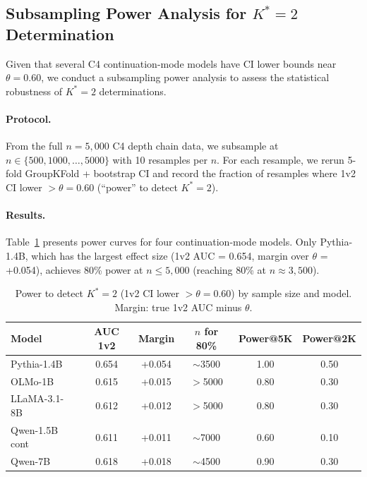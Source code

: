 \documentclass[11pt,a4paper]{article}
\begin{document}
\subsection{Subsampling Power Analysis for $K^*=2$ Determination}
\label{sec:power_analysis}

Given that several C4 continuation-mode models have CI lower bounds near $\theta = 0.60$, we conduct a subsampling power analysis to assess the statistical robustness of $K^*=2$ determinations.

\paragraph{Protocol.}
From the full $n=5{,}000$ C4 depth chain data, we subsample at $n \in \{500, 1000, \ldots, 5000\}$ with 10 resamples per $n$. For each resample, we rerun 5-fold GroupKFold + bootstrap CI and record the fraction of resamples where 1v2 CI lower $> \theta = 0.60$ (``power'' to detect $K^*=2$).

\paragraph{Results.}
Table~\ref{tab:power} presents power curves for four continuation-mode models. Only Pythia-1.4B, which has the largest effect size (1v2 AUC = 0.654, margin over $\theta$ = +0.054), achieves 80\% power at $n \leq 5{,}000$ (reaching 80\% at $n \approx 3{,}500$).

\begin{table}[h]
\centering
\caption{Power to detect $K^*=2$ (1v2 CI lower $> \theta = 0.60$) by sample size and model. Margin: true 1v2 AUC minus $\theta$.}
\label{tab:power}
\small
\begin{tabular}{lccccc}
\toprule
\textbf{Model} & \textbf{AUC 1v2} & \textbf{Margin} & \textbf{$n$ for 80\%} & \textbf{Power@5K} & \textbf{Power@2K} \\
\midrule
Pythia-1.4B & 0.654 & +0.054 & $\sim$3500 & 1.00 & 0.50 \\
OLMo-1B & 0.615 & +0.015 & $>$5000 & 0.80 & 0.30 \\
LLaMA-3.1-8B & 0.612 & +0.012 & $>$5000 & 0.80 & 0.30 \\
Qwen-1.5B cont & 0.611 & +0.011 & $\sim$7000 & 0.60 & 0.10 \\
Qwen-7B & 0.618 & +0.018 & $\sim$4500 & 0.90 & 0.30 \\
\bottomrule
\end{tabular}
\end{table}
\end{document}
